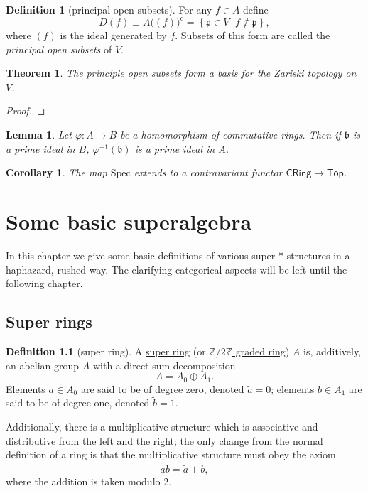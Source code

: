 \documentclass[a4paper,10pt]{scrreprt}
\newcommand{\Z}{\mathbb{Z}}
\newcommand{\defn}[1]{\ul{#1}}
\newcommand{\Spec}{\mathrm{Spec}}
\theoremstyle{definition}
\newtheorem{definition}{Definition}[section]
\theoremstyle{plain}
\newtheorem{theorem}{Theorem}[section]
\newtheorem{lemma}{Lemma}[section]
\newtheorem{corollary}{Corollary}[section]
\theoremstyle{remark}
\begin{document}
\begin{definition}[principal open subsets]
  \label{def:principalopensubsets}
  For any $f \in A$ define 
  \begin{equation*}
    D(f) \equiv A\big((f)\big)^{\mathrm{c}} = \left\{ \mathfrak{p} \in V\,\big|\, f \notin \mathfrak{p} \right\},
  \end{equation*}
  where $(f)$ is the ideal generated by $f$. Subsets of this form are called the \emph{principal open subsets} of $V$.
\end{definition}

\begin{theorem}
  The principle open subsets form a basis for the Zariski topology on $V$.
\end{theorem}
\begin{proof}
  
\end{proof}

\begin{lemma}
  Let $\varphi\colon A \to B$ be a homomorphism of commutative rings. Then if $\mathfrak{b}$ is a prime ideal in $B$, $\varphi^{-1}(\mathfrak{b})$ is a prime ideal in $A$.
\end{lemma}

\begin{corollary}
  The map $\Spec$ extends to a contravariant functor $\mathsf{CRing} \to \mathsf{Top}$.
\end{corollary}



\chapter{Some basic superalgebra} 
In this chapter we give some basic definitions of various super-* structures in a haphazard, rushed way. The clarifying categorical aspects will be left until the following chapter.
\section{Super rings}
\begin{definition}[super ring]
  \label{def:superring}
  A \defn{super ring} (or \defn{$\Z/2\Z$ graded ring}) $A$ is, additively, an abelian group $A$ with a direct sum decomposition
  \begin{equation*}
    A = A_{0} \oplus A_{1}.
  \end{equation*}
  Elements $a\in A_{0}$ are said to be of degree zero, denoted $\tilde{a} = 0$; elements $b\in A_{1}$ are said to be of degree one, denoted $\tilde{b} = 1$.

  Additionally, there is a multiplicative structure which is associative and distributive from the left and the right; the only change from the normal definition of a ring is that the multiplicative structure must obey the axiom
  \begin{equation*}
    \widetilde{ab} = \tilde{a} + \tilde{b},
  \end{equation*}
  where the addition is taken modulo 2.
\end{definition}
\end{document}
